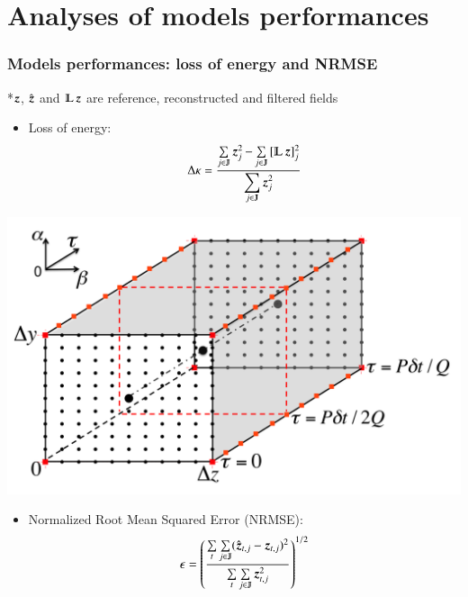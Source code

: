 \documentclass{beamer}
\let\olditem\item
\renewcommand{\item}{\setlength{\itemsep}{\fill}\olditem}
\begin{document}
\section[Models performances]{Analyses of models performances}
\begin{frame}
\frametitle{Models performances: loss of energy and NRMSE}
	*$ \operatorname{\boldsymbol{z}} $, $ \hat{\operatorname{\boldsymbol{z}}} $ and $ \LPF \z $ are reference, reconstructed and filtered fields

	\begin{minipage}{\textwidth}
		\begin{minipage}{0.5\textwidth}
			\begin{itemize}
			\item Loss of energy:
			\begin{equation*}
				\Delta\kappa=\frac{\sum\limits_{j\in \varmathbb{J}} \z _j^2-\sum\limits_{j\in \varmathbb{J}}{[\LPF\z ]_j^2}}{\displaystyle \sum\limits_{j\in \varmathbb{J}}\z _j^2}
			\end{equation*} 
			\end{itemize}
		\end{minipage}		
		\begin{minipage}{0.5\textwidth}
			\includegraphics[width=\columnwidth]{./figures/experimentalsetup/elementblock.png}
		\end{minipage}		
	\end{minipage}
	\begin{itemize}	
		\item Normalized Root Mean Squared Error (NRMSE):
		\begin{equation*}
		\epsilon = \left(\frac{ \sum\limits_{t} \sum\limits_{j\in \varmathbb{J}}(\hat{\mybold{z}}_{t,j}-\mybold{z}_{t,j})^2}{\sum\limits_{t} \sum\limits_{j\in \varmathbb{J}}\mybold{z}_{t,j}^2}\right)^{1/2}
		\end{equation*} 
	\end{itemize}		
\end{frame}
\end{document}
